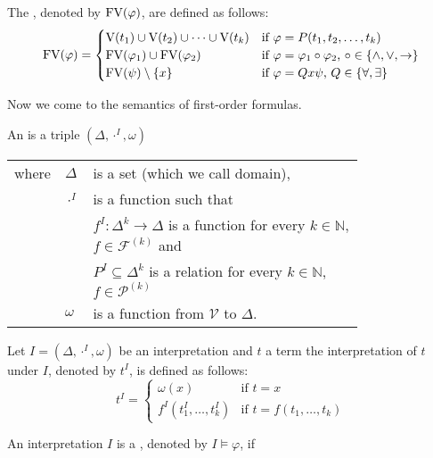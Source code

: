 \begin{definition}
The , denoted by $\text{FV}(\varphi)$, are defined as follows:
\[\text{FV}(\varphi)=
\begin{cases}
\text{V}(t_1)\cup \text{V}(t_2)\cup\dots\cup \text{V}(t_k) & \text{if $\varphi=P(t_1,t_2,\dots,t_k)$}\\
\text{FV}(\varphi_1)\cup\text{FV}(\varphi_2) & \text{if $\varphi=\varphi_1\circ\varphi_2$, $\circ\in\{\wedge,\vee,\to\}$}\\
\text{FV}(\psi)\setminus\{x\} & \text{if $\varphi=Q x\psi$, $Q\in\{\forall,\exists\}$}
\end{cases}\]
\end{definition}
Now we come to the semantics of first-order formulas.
\begin{definition}
An  is a triple $(\Delta,\cdot^I,\omega)$
\begin{tabular}{llp{0.78\linewidth}}
		where & $\Delta$      & is a set (which we call  domain),                                                                                                       \\
		      & $\cdot^I$ & is a function such that\\
		      & & $f^I:\Delta^k\to\Delta$  is a function for every $k\in\mathbb{N}$, $f\in\mathcal{F}^{(k)}$ and \\
		      & & $P^I\subseteq\Delta^k$ is a relation for every $k\in\mathbb{N}$, $f\in\mathcal{P}^{(k)}$ \\
		      & $\omega$ & is a function from $\mathcal{V}$ to $\Delta$.                       
	\end{tabular}
\end{definition}
\begin{definition}
Let $I=(\Delta,\cdot^I,\omega)$ be an interpretation and $t$ a term the interpretation of $t$ under $I$, denoted by $t^I$, is defined as follows:
\[t^I=
\begin{cases}
\omega(x) & \text{if $t=x$}\\
f^I(t^I_1,\dots,t^I_k) & \text{if $t=f(t_1,\dots,t_k)$}
\end{cases}\]
\end{definition}
\begin{definition}
An interpretation $I$ is a , denoted by $I\models\varphi$, if  
\end{definition}